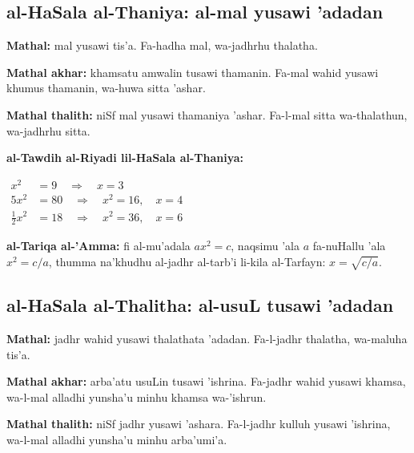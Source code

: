 \documentclass[11pt,a4paper]{book}
\begin{document}
\subsection{al-HaSala al-Thaniya: al-mal yusawi 'adadan}

\begin{originaltext}
\textbf{Mathal:} mal yusawi tis'a. Fa-hadha mal, wa-jadhrhu thalatha.

\textbf{Mathal akhar:} khamsatu amwalin tusawi thamanin. Fa-mal wahid
yusawi khumus thamanin, wa-huwa sitta 'ashar.

\textbf{Mathal thalith:} niSf mal yusawi thamaniya 'ashar. Fa-l-mal
sitta wa-thalathun, wa-jadhrhu sitta.
\end{originaltext}

\begin{mathexplain}
\textbf{al-Tawdih al-Riyadi lil-HaSala al-Thaniya:}

\begin{center}
$\begin{aligned}
  x^2 &= 9 \quad\Rightarrow\quad x = 3 \\
  5x^2 &= 80 \quad\Rightarrow\quad x^2 = 16, \quad x = 4 \\
  \tfrac{1}{2}x^2 &= 18 \quad\Rightarrow\quad x^2 = 36, \quad x = 6
\end{aligned}$
\end{center}

\textbf{al-Tariqa al-'Amma:} fi al-mu'adala $ax^2 = c$, naqsimu 'ala
$a$ fa-nuHallu 'ala $x^2 = c/a$, thumma na'khudhu al-jadhr al-tarb'i
li-kila al-Tarfayn: $x = \sqrt{c/a}$.
\end{mathexplain}

\subsection{al-HaSala al-Thalitha: al-usuL tusawi 'adadan}

\begin{originaltext}
\textbf{Mathal:} jadhr wahid yusawi thalathata 'adadan. Fa-l-jadhr
thalatha, wa-maluha tis'a.

\textbf{Mathal akhar:} arba'atu usuLin tusawi 'ishrina. Fa-jadhr wahid
yusawi khamsa, wa-l-mal alladhi yunsha'u minhu khamsa wa-'ishrun.

\textbf{Mathal thalith:} niSf jadhr yusawi 'ashara. Fa-l-jadhr kulluh
yusawi 'ishrina, wa-l-mal alladhi yunsha'u minhu arba'umi'a.
\end{originaltext}
\end{document}
